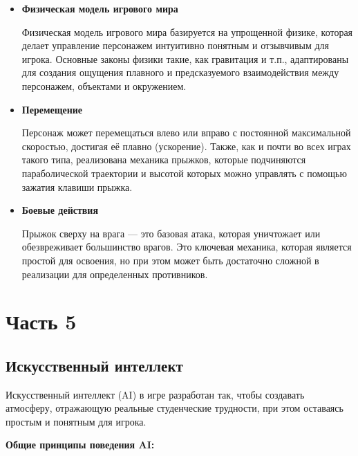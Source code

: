 \documentclass{article}
\begin{document}
\begin{itemize}
    \item \textbf{Физическая модель игрового мира} \par
    Физическая модель игрового мира базируется на упрощенной физике, которая делает управление персонажем интуитивно понятным и отзывчивым для игрока. Основные законы физики такие, как гравитация и т.п., адаптированы для создания ощущения плавного и предсказуемого взаимодействия между персонажем, объектами и окружением.
    \item \textbf{Перемещение} \par
    Персонаж может перемещаться влево или вправо с постоянной максимальной скоростью, достигая её плавно (ускорение). Также, как и почти во всех играх такого типа, реализована механика прыжков, которые подчиняются параболической траектории и высотой которых можно управлять с помощью зажатия клавиши прыжка.
    \item \textbf{Боевые действия} \par
    Прыжок сверху на врага — это базовая атака, которая уничтожает или обезвреживает большинство врагов. Это ключевая механика, которая является простой для освоения, но при этом может быть достаточно сложной в реализации для определенных противников.
\end{itemize}

\section{Часть 5}

\subsection*{Искусственный интеллект}

Искусственный интеллект (AI) в игре разработан так, чтобы создавать атмосферу, отражающую реальные студенческие трудности, при этом оставаясь простым и понятным для игрока.

\textbf{Общие принципы поведения AI:}
\end{document}
